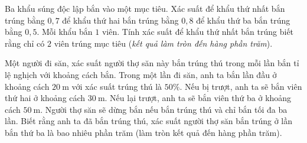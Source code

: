 \begin{ex}%
	Ba khẩu súng độc lập bắn vào một mục tiêu. Xác suất để khẩu thứ nhất bắn trúng bằng $0{,}7$ để khẩu thứ hai bắn trúng bằng $0{,}8$ để khẩu thứ ba bắn trúng bằng $0{,}5$. Mỗi khẩu bắn $1$ viên. Tính xác suất để khẩu thứ nhất bắn trúng biết rằng chỉ có $2$ viên trúng mục tiêu (\textit{kết quả làm tròn đến hàng phần trăm}).
\end{ex}

%

\begin{ex}%
	Một người đi săn, xác suất người thợ săn này bắn trúng thú trong mỗi lần bắn tỉ lệ nghịch với khoảng cách bắn. Trong một lần đi săn, anh ta bắn lần đầu ở khoảng cách $20 \mathrm{~m}$ với xác suất trúng thú là $50 \%$. Nếu bị trượt, anh ta sẽ bắn viên thứ hai ở khoảng cách $30 \mathrm{~m}$. Nếu lại trượt, anh ta sẽ bắn viên thứ ba ở khoảng cách $50 \mathrm{~m}$. Người thợ săn sẽ dừng bắn nếu bắn trúng thú và chỉ bắn tối đa ba lần. Biết rằng anh ta đã bắn trúng thú, xác suất người thợ săn bắn trúng ở lần bắn thứ ba là bao nhiêu phần trăm (làm tròn kết quả đến hàng phần trăm).
\end{ex}

